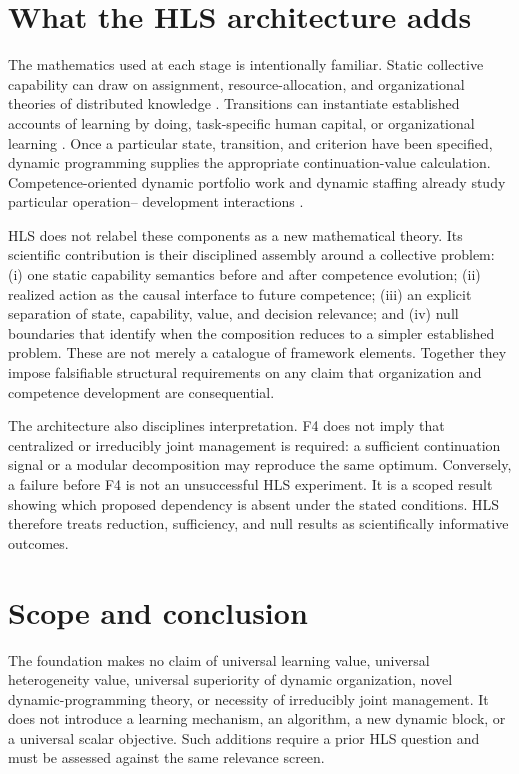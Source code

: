 \documentclass[10pt]{article}
\begin{document}
\section{What the HLS architecture adds}

The mathematics used at each stage is intentionally familiar. Static
collective capability can draw on assignment, resource-allocation, and
organizational theories of distributed knowledge \citep{garicano2000}.
Transitions can instantiate established accounts of learning by doing,
task-specific human capital, or organizational learning
\citep{arrow1962,gibbonswaldman2004,argotemiron2011}. Once a particular state,
transition, and criterion have been specified, dynamic programming supplies
the appropriate continuation-value calculation. Competence-oriented dynamic
portfolio work and dynamic staffing already study particular operation--
development interactions \citep{gutjahr2011,borgonjon2024dynamic}.

HLS does not relabel these components as a new mathematical theory. Its
scientific contribution is their disciplined assembly around a collective
problem: (i) one static capability semantics before and after competence
evolution; (ii) realized action as the causal interface to future competence;
(iii) an explicit separation of state, capability, value, and decision
relevance; and (iv) null boundaries that identify when the composition reduces
to a simpler established problem. These are not merely a catalogue of
framework elements. Together they impose falsifiable structural requirements
on any claim that organization and competence development are consequential.

The architecture also disciplines interpretation. F4 does not imply that
centralized or irreducibly joint management is required: a sufficient
continuation signal or a modular decomposition may reproduce the same optimum.
Conversely, a failure before F4 is not an unsuccessful HLS experiment. It is a
scoped result showing which proposed dependency is absent under the stated
conditions. HLS therefore treats reduction, sufficiency, and null results as
scientifically informative outcomes.

\section{Scope and conclusion}

The foundation makes no claim of universal learning value, universal
heterogeneity value, universal superiority of dynamic organization, novel
dynamic-programming theory, or necessity of irreducibly joint management. It
does not introduce a learning mechanism, an algorithm, a new dynamic block, or
a universal scalar objective. Such additions require a prior HLS question and
must be assessed against the same relevance screen.
\end{document}
